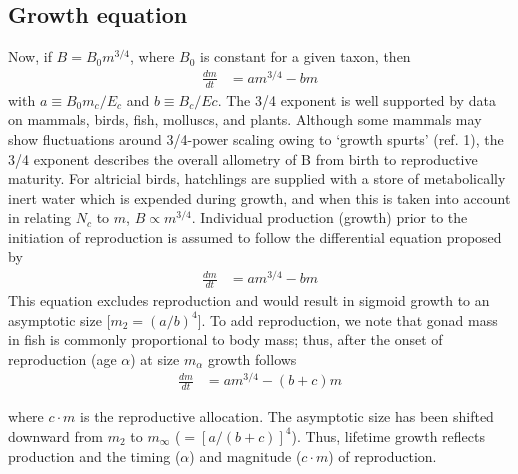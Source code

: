 \documentclass[a3paper]{article} %
\begin{document}
\begin{multicols}{2}
\section{Growth equation}
Now, if $B = B_{0}m^{3/4}$, where $B_0$ is constant for a given taxon, then
\begin{align}
    \frac{dm}{dt} &= am^{3/4} - bm
\end{align}
with $a \equiv B_{0}m_{c}/E_{c}$ and $b \equiv B_{c}/E{c}$. The 3/4 exponent is well supported by data on mammals, birds, fish, molluscs, and plants.
Although some mammals may show fluctuations around 3/4-power scaling owing to `growth spurts' (ref. 1), the 3/4 exponent describes the overall allometry of B from birth to reproductive maturity. For altricial birds, hatchlings are supplied with a store of metabolically inert water which is expended during growth, and when this is taken into account in relating $N_c$ to $m$, $B \propto m^{3/4}$.
Individual production (growth) prior to the initiation of reproduction is assumed to follow the differential equation proposed by \cite{West2001}
\begin{align}
    \frac{dm}{dt} &= am^{3/4} - bm
\end{align}
This equation excludes reproduction and would result in sigmoid growth to an asymptotic size [$m_{2} = (a/b)^{4}$]. To add reproduction, we note that gonad mass in fish is commonly proportional to body mass; thus, after the onset of reproduction (age $\alpha$) at size $m_{\alpha}$ growth follows
\begin{align}
    \frac{dm}{dt} &= am^{3/4} - (b+c)m
\end{align}

\columnbreak
where $c \cdot m$ is the reproductive allocation. The asymptotic size has been shifted downward from $m_2$ to $m_{\infty}$ ($= [a/(b+c)]^4$). Thus, lifetime growth reflects production and the timing ($\alpha$) and magnitude ($c\cdot{m}$) of reproduction.


\end{multicols}
\end{document}

